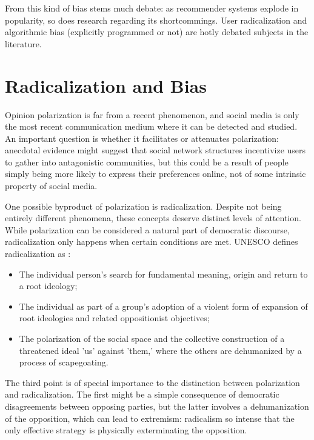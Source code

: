 From this kind of bias stems much debate: as recommender systems explode in
popularity, so does research regarding its shortcommings. User radicalization
and algorithmic bias (explicitly programmed or not) are hotly debated subjects
in the literature.

\section{Radicalization and Bias}
\label{sec:radicalization_bias}

Opinion polarization is far from a recent phenomenon, and social media is only
the most recent communication medium where it can be detected and studied. An
important question is whether it facilitates or attenuates polarization:
anecdotal evidence might suggest that social network structures incentivize
users to gather into antagonistic communities, but this could be a result of
people simply being more likely to express their preferences online, not of some
intrinsic property of social media.

One possible byproduct of polarization is radicalization. Despite not being
entirely different phenomena, these concepts deserve distinct levels of
attention. While polarization can be considered a natural part of democratic
discourse, radicalization only happens when certain conditions are met. UNESCO
defines radicalization as \citep{seraphin_youth_2017}:

\begin{itemize}
  \item The individual person's search for fundamental meaning, origin and
        return to a root ideology;
  \item The individual as part of a group's adoption of a violent form of
        expansion of root ideologies and related oppositionist objectives;
  \item The polarization of the social space and the collective construction of
        a threatened ideal 'us' against 'them,' where the others are dehumanized
        by a process of scapegoating.
\end{itemize}

The third point is of special importance to the distinction between polarization
and radicalization. The first might be a simple consequence of democratic
disagreements between opposing parties, but the latter involves a dehumanization
of the opposition, which can lead to extremism: radicalism so intense that the
only effective strategy is physically exterminating the opposition.

